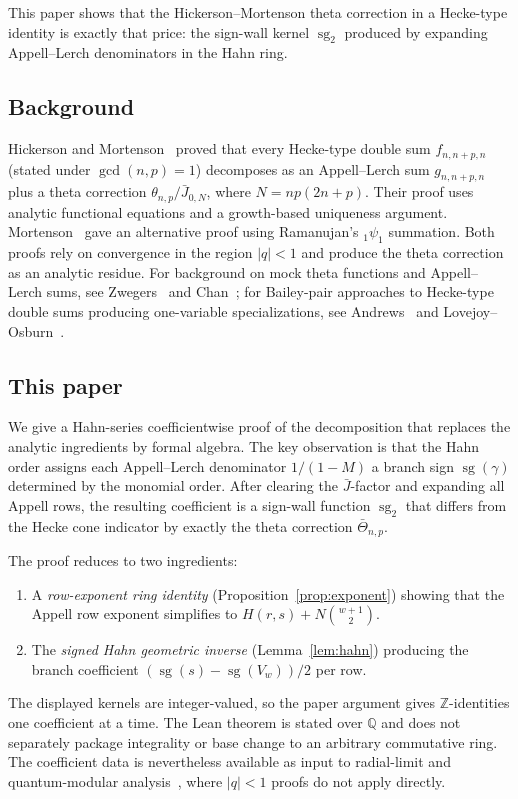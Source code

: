 \documentclass[11pt]{article}
\newcommand{\Z}{\mathbb{Z}}
\newcommand{\Q}{\mathbb{Q}}
\newcommand{\sg}{\operatorname{sg}}
\newcommand{\sgtwo}{\operatorname{sg}_2}
\begin{document}
This paper shows that the Hickerson--Mortenson theta correction
in a Hecke-type identity is exactly that price: the sign-wall
kernel $\sgtwo$ produced by expanding Appell--Lerch denominators
in the Hahn ring.

\subsection*{Background}

Hickerson and Mortenson~\cite{jHiMo14} proved that every Hecke-type
double sum $f_{n,n+p,n}$ (stated under $\gcd(n,p)=1$) decomposes as an
Appell--Lerch sum $g_{n,n+p,n}$ plus a theta correction
$\theta_{n,p}/\bar{J}_{0,N}$, where $N=np(2n+p)$.  Their proof uses
analytic functional equations and a growth-based uniqueness argument.
Mortenson~\cite{jMo12} gave an alternative proof using Ramanujan's
${}_1\psi_1$ summation.  Both proofs rely on convergence in the region
$|q|<1$ and produce the theta correction as an analytic residue.
For background on mock theta functions and
Appell--Lerch sums, see Zwegers~\cite{oZw02} and Chan~\cite{oCh11};
for Bailey-pair approaches to Hecke-type double sums producing
one-variable specializations, see Andrews~\cite{jAn01} and
Lovejoy--Osburn~\cite{jLO13}.

\subsection*{This paper}

We give a Hahn-series coefficientwise proof of the decomposition
that replaces the analytic ingredients by formal algebra.  The key observation
is that the Hahn order assigns each Appell--Lerch denominator
$1/(1-M)$ a branch sign $\sg(\gamma)$ determined by the
monomial order.  After clearing the $\bar{J}$-factor and expanding all
Appell rows, the resulting coefficient is a sign-wall function
$\sgtwo$ that differs from the Hecke cone indicator by exactly
the theta correction $\bar\Theta_{n,p}$.

The proof reduces to two ingredients:
\begin{enumerate}
\item A \emph{row-exponent ring identity} (Proposition~\ref{prop:exponent})
  showing that the Appell row exponent simplifies to $H(r,s)+N\binom{w+1}{2}$.
\item The \emph{signed Hahn geometric inverse} (Lemma~\ref{lem:hahn})
  producing the branch coefficient $(\sg(s)-\sg(V_w))/2$ per row.
\end{enumerate}
The displayed kernels are integer-valued, so the paper argument gives
$\Z$-identities one coefficient at a time.  The Lean theorem is stated over
$\Q$ and does not separately package integrality or base change to an
arbitrary commutative ring.  The coefficient data is nevertheless available
as input to radial-limit and quantum-modular analysis~\cite{jZag10,jFOR13},
where $|q|<1$ proofs do not apply directly.
\end{document}
